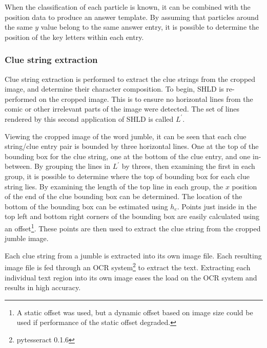 \documentclass{article}
\begin{document}
	When the classification of each particle is known, it can be combined with the position data to produce an answer template.  By assuming that particles around the same $y$ value belong to the same answer entry, it is possible to determine the position of the key letters within each entry.
	
	\subsubsection{Clue string extraction}
	Clue string extraction is performed to extract the clue strings from the cropped image, and determine their character composition.  To begin, SHLD is re-performed on the cropped image.  This is to ensure no horizontal lines from the comic or other irrelevant parts of the image were detected.  The set of lines rendered by this second application of SHLD is called $L^\prime$. \par \hspace{10pt}
	Viewing the cropped image of the word jumble, it can be seen that each clue string/clue entry pair is bounded by three horizontal lines.  One at the top of the bounding box for the clue string, one at the bottom of the clue entry, and one in-between.  By grouping the lines in $L^\prime$ by threes, then examining the first in each group, it is possible to determine where the top of bounding box for each clue string lies.  By examining the length of the top line in each group, the $x$ position of the end of the clue bounding box can be determined. The location of the bottom of the bounding box can be estimated using $h_e$.  Points just inside in the top left and bottom right corners of the bounding box are easily calculated using an offset\footnote{A static offset was used, but a dynamic offset based on image size could be used if performance of the static offset degraded.}.  These points are then used to extract the clue string from the cropped jumble image.  \par \hspace{10pt}
	Each clue string from a jumble is extracted into its own image file.  Each resulting image file is fed through an OCR system\footnote{pytesseract 0.1.6} to extract the text.  Extracting each individual text region into its own image eases the load on the OCR system and results in high accuracy.
	
\end{document}
